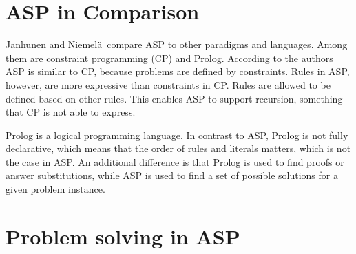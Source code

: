\documentclass[runningheads]{llncs}
\newcommand{\authorquote}{Janhunen and Niemelä~}
\begin{document}





\section{ASP in Comparison}

\authorquote compare ASP to other paradigms and languages. Among them are constraint programming (CP) and Prolog. According to the authors ASP is similar to CP, because problems are defined by constraints. Rules in ASP, however, are more expressive than constraints in CP. Rules are allowed to be defined based on other rules. This enables ASP to support recursion, something that CP is not able to express. 

Prolog is a logical programming language. In contrast to ASP, Prolog is not fully declarative, which means that the order of rules and literals matters, which is not the case in ASP. An additional difference is that Prolog is used to find proofs or answer substitutions, while ASP is used to find a set of possible solutions for a given problem instance.


\begin{comment}
\begin{itemize}
     \item Prolog vs. ASP: Prolog is logic programming. ASP is fully declarative, so order of rules/literals does not matter. Prolog is used to find proofs or answer substitutions, while ASP is used to find the complete solution. 
   \item ASP similar to constraint programming (CP), because problems are defined by constraints and systems try to find solutions to that. ASP allows to construct a rule out of simpler rules and having rules also allows for things that are not possible in CP, like recursive constraints. 
\end{itemize}
\end{comment}




\section{Problem solving in ASP}
\end{document}
